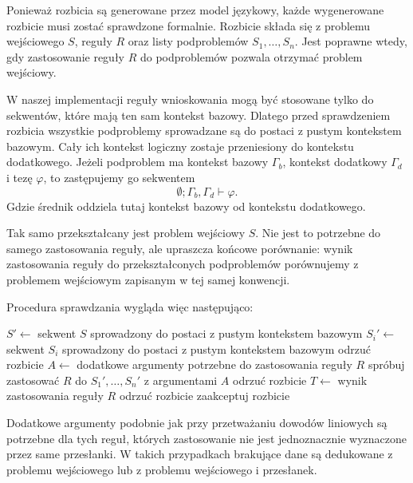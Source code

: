 \documentclass[shortabstract]{iithesis}
\theoremstyle{definition}
\theoremstyle{remark}
\theoremstyle{plain}
\begin{document}
Ponieważ rozbicia są generowane przez model językowy, każde wygenerowane rozbicie
musi zostać sprawdzone formalnie. Rozbicie składa się z problemu wejściowego \(S\),
reguły \(R\) oraz listy podproblemów \(S_1,\ldots,S_n\). Jest poprawne wtedy, gdy
zastosowanie reguły \(R\) do podproblemów pozwala otrzymać problem wejściowy.

W naszej implementacji reguły wnioskowania mogą być stosowane tylko do sekwentów,
które mają ten sam kontekst bazowy. Dlatego przed sprawdzeniem rozbicia wszystkie
podproblemy sprowadzane są do postaci z pustym kontekstem bazowym. Cały ich
kontekst logiczny zostaje przeniesiony do kontekstu dodatkowego. Jeżeli podproblem
ma kontekst bazowy \(\Gamma_b\), kontekst dodatkowy \(\Gamma_d\) i tezę \(\varphi\),
to zastępujemy go sekwentem
\[
    \emptyset ; \Gamma_b,\Gamma_d \vdash \varphi.
\]
Gdzie średnik oddziela tutaj kontekst bazowy od kontekstu dodatkowego.

Tak samo przekształcany jest problem wejściowy \(S\). Nie jest to potrzebne do
samego zastosowania reguły, ale upraszcza końcowe porównanie: wynik zastosowania
reguły do przekształconych podproblemów porównujemy z problemem wejściowym
zapisanym w tej samej konwencji.

Procedura sprawdzania wygląda więc następująco:


\begin{algorithm}[H]
\caption{Sprawdzanie poprawności rozbicia}
\begin{algorithmic}[1]
    \State \(S' \gets\) sekwent \(S\) sprowadzony do postaci z pustym kontekstem bazowym
        \State \(S_i' \gets\) sekwent \(S_i\) sprowadzony do postaci z pustym kontekstem bazowym
            \State \Return odrzuć rozbicie
        \EndIf
    \EndFor
    \State \(A \gets\) dodatkowe argumenty potrzebne do zastosowania reguły \(R\)
    \State spróbuj zastosować \(R\) do \(S_1',\ldots,S_n'\) z argumentami \(A\)
        \State \Return odrzuć rozbicie
    \EndIf
    \State \(T \gets\) wynik zastosowania reguły \(R\)
        \State \Return odrzuć rozbicie
    \EndIf
    \State \Return zaakceptuj rozbicie
\EndProcedure
\end{algorithmic}
\end{algorithm}



Dodatkowe argumenty podobnie jak przy przetważaniu dowodów liniowych są potrzebne dla tych reguł, których zastosowanie  nie jest
jednoznacznie wyznaczone przez same przesłanki.  W takich przypadkach
brakujące dane są dedukowane z problemu wejściowego lub z problemu wejściowego i przesłanek.
\end{document}
